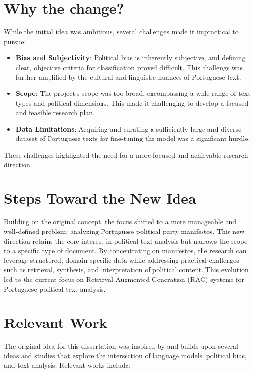 \section*{Why the change?}

While the initial idea was ambitious, several challenges made it impractical to pursue:

\begin{itemize}
    \item \textbf{Bias and Subjectivity}: Political bias is inherently subjective, and defining clear, objective criteria for classification proved difficult. This challenge was further amplified by the cultural and linguistic nuances of Portuguese text.
    \item \textbf{Scope}: The project's scope was too broad, encompassing a wide range of text types and political dimensions. This made it challenging to develop a focused and feasible research plan.
    \item \textbf{Data Limitations}: Acquiring and curating a sufficiently large and diverse dataset of Portuguese texts for fine-tuning the model was a significant hurdle.
\end{itemize}

These challenges highlighted the need for a more focused and achievable research direction.


\section*{Steps Toward the New Idea}

Building on the original concept, the focus shifted to a more manageable and well-defined problem: analyzing Portuguese political party manifestos. This new direction retains the core interest in political text analysis but narrows the scope to a specific type of document. By concentrating on manifestos, the research can leverage structured, domain-specific data while addressing practical challenges such as retrieval, synthesis, and interpretation of political content. This evolution led to the current focus on Retrieval-Augmented Generation (RAG) systems for Portuguese political text analysis.


\section*{Relevant Work}

The original idea for this dissertation was inspired by and builds upon several ideas and studies that explore the intersection of language models, political bias, and text analysis. Relevant works include:

